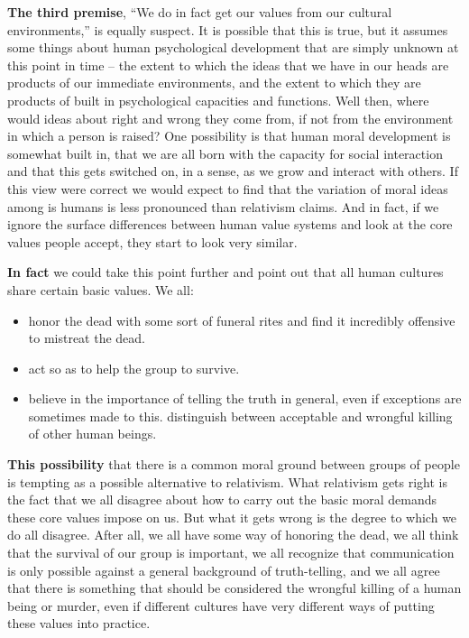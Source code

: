\documentclass[]{book}
\providecommand{\tightlist}{%
  \setlength{\itemsep}{0pt}\setlength{\parskip}{0pt}}
\begin{document}
\textbf{The third premise}, ``We do in fact get our values from our cultural environments,'' is equally suspect. It is possible that this is true, but it assumes some things about human psychological development that are simply unknown at this point in time -- the extent to which the ideas that we have in our heads are products of our immediate environments, and the extent to which they are products of built in psychological capacities and functions. Well then, where would ideas about right and wrong they come from, if not from the environment in which a person is raised? One possibility is that human moral development is somewhat built in, that we are all born with the capacity for social interaction and that this gets switched on, in a sense, as we grow and interact with others. If this view were correct we would expect to find that the variation of moral ideas among is humans is less pronounced than relativism claims. And in fact, if we ignore the surface differences between human value systems and look at the core values people accept, they start to look very similar.

\textbf{In fact} we could take this point further and point out that all human cultures share certain basic values. We all:

\begin{itemize}
\tightlist
\item
  honor the dead with some sort of funeral rites and find it incredibly offensive to mistreat the dead.
\item
  act so as to help the group to survive.
\item
  believe in the importance of telling the truth in general, even if exceptions are sometimes made to this. distinguish between acceptable and wrongful killing of other human beings.
\end{itemize}

\textbf{This possibility} that there is a common moral ground between groups of people is tempting as a possible alternative to relativism. What relativism gets right is the fact that we all disagree about how to carry out the basic moral demands these core values impose on us. But what it gets wrong is the degree to which we do all disagree. After all, we all have some way of honoring the dead, we all think that the survival of our group is important, we all recognize that communication is only possible against a general background of truth-telling, and we all agree that there is something that should be considered the wrongful killing of a human being or murder, even if different cultures have very different ways of putting these values into practice.
\end{document}
